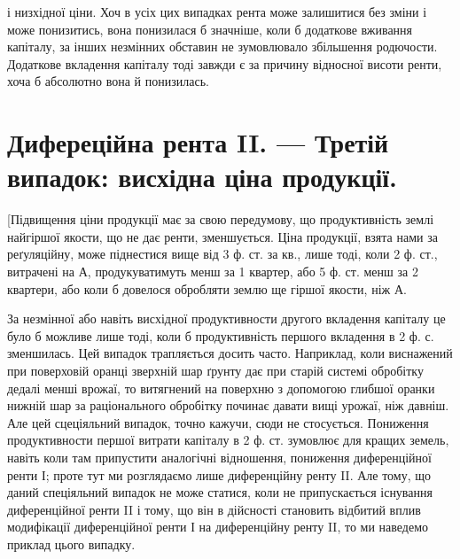 \parcont{}  %
і низхідної ціни. Хоч в усіх цих випадках рента може залишитися без зміни
і може понизитись, вона понизилася б значніше, коли б додаткове вживання
капіталу, за інших незмінних обставин не зумовлювало збільшення родючости. Додаткове вкладення
капіталу тоді завжди є за причину відносної висоти ренти,
хоча б абсолютно вона й понизилась.

\section{Дифереційна рента II. — Третій випадок:
висхідна ціна продукції.}

[Підвищення ціни продукції має за свою передумову, що продуктивність землі
найгіршої якости, що не дає ренти, зменшується. Ціна продукції, взята нами за
реґуляційну, може піднестися вище від 3 ф. ст. за кв., лише тоді, коли 2  ф. ст.,
витрачені на А, продукуватимуть менш за 1 квартер, або 5 ф. ст. менш за
2 квартери, або коли б довелося обробляти землю ще гіршої якости, ніж А.

За незмінної або навіть висхідної продуктивности другого вкладення капіталу
це було б можливе лише тоді, коли б продуктивність першого вкладення в 2  ф. с.
зменшилась. Цей випадок трапляється досить часто. Наприклад, коли виснажений
при поверховій оранці зверхній шар ґрунту дає при старій системі обробітку
дедалі менші врожаї, то витягнений на поверхню з допомогою глибшої
оранки нижній шар за раціонального обробітку починає давати вищі
урожаї, ніж давніш. Але цей сцеціяльний випадок, точно кажучи, сюди не
стосується. Пониження продуктивности першої витрати капіталу в 2 ф. ст. зумовлює для кращих
земель, навіть коли там припустити аналогічні відношення,
пониження диференційної ренти І; проте тут ми розглядаємо лише диференційну
ренту II. Але тому, що даний спеціяльний випадок не може статися, коли не
припускається існування диференційної ренти II і тому, що він в дійсності
становить відбитий вплив модифікації диференційної ренти І на диференційну
ренту II, то ми наведемо приклад цього випадку.

